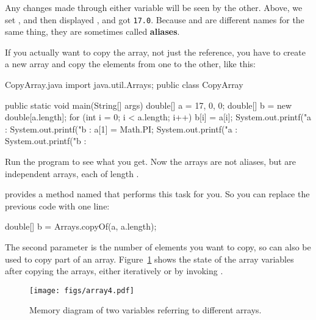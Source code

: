 
Any changes made through either variable will be seen by the other.
Above, we set , and then displayed , and got {\tt 17.0}.
Because  and  are different names for the same thing, they are sometimes called {\bf aliases}.

If you actually want to copy the array, not just the reference, you have to create a new array and copy the elements from one to the other, like this:

\begin{trinket} [320] {CopyArray.java}
import java.util.Arrays;
public class CopyArray {

    public static void main(String[] args) {
       double[] a = {17, 0, 0};
       double[] b = new double[a.length];
       for (int i = 0; i < a.length; i++){
          b[i] = a[i];
       }
       System.out.printf("a : %
       System.out.printf("b : %
       a[1] = Math.PI;
       System.out.printf("a : %
       System.out.printf("b : %
    }
}
\end{trinket}

Run the program to see what you get.  Now the arrays are not aliases, but are independent arrays, each of length .


 provides a method named  that performs this task for you.
So you can replace the previous code with one line:

\begin{code}
double[] b = Arrays.copyOf(a, a.length);
\end{code}

The second parameter is the number of elements you want to copy, so  can also be used to copy part of an array.
Figure~\ref{fig.array4} shows the state of the array variables after copying the arrays, either iteratively or by invoking .

\begin{figure}[!ht]
\begin{center}
\texttt{[image: figs/array4.pdf]}
\caption{Memory diagram of two variables referring to different arrays.}
\label{fig.array4}
\end{center}
\end{figure}


